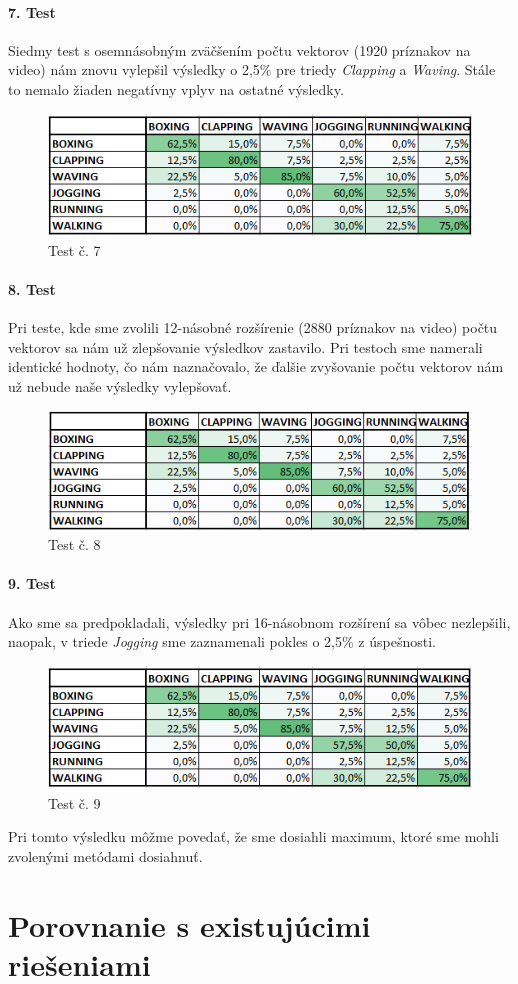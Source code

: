 \paragraph{7. Test} 
Siedmy test s osemnásobným zväčšením počtu vektorov (1920 príznakov na video) nám znovu vylepšil výsledky o 2,5\% pre triedy \textit{Clapping} a \textit{Waving}. Stále to nemalo žiaden negatívny vplyv na ostatné výsledky.
\begin{figure}[H]
  \centering
  \includegraphics[width=14cm]{img/test6PCA8g.png}
  \caption{Test č. 7}
  \label{test7}
\end{figure} 

\paragraph{8. Test}
Pri teste, kde sme zvolili 12-násobné rozšírenie (2880 príznakov na video) počtu vektorov sa nám už zlepšovanie výsledkov zastavilo. Pri testoch sme namerali identické hodnoty, čo nám naznačovalo, že ďalšie zvyšovanie počtu vektorov nám už nebude naše výsledky vylepšovať.
\begin{figure}[H]
  \centering
  \includegraphics[width=14cm]{img/test6PCA12g.png}
  \caption{Test č. 8}
  \label{test8}
\end{figure}  

\paragraph{9. Test} 
Ako sme sa predpokladali, výsledky pri 16-násobnom rozšírení sa vôbec nezlepšili, naopak, v triede \textit{Jogging} sme zaznamenali pokles o 2,5\% z úspešnosti. 
\begin{figure}[H]
  \centering
  \includegraphics[width=14cm]{img/test6PCA16g.png}
  \caption{Test č. 9}
  \label{test9}
\end{figure} 

Pri tomto výsledku môžme povedať, že sme dosiahli maximum, ktoré sme mohli zvolenými metódami dosiahnuť. 

\section{Porovnanie s existujúcimi riešeniami}



